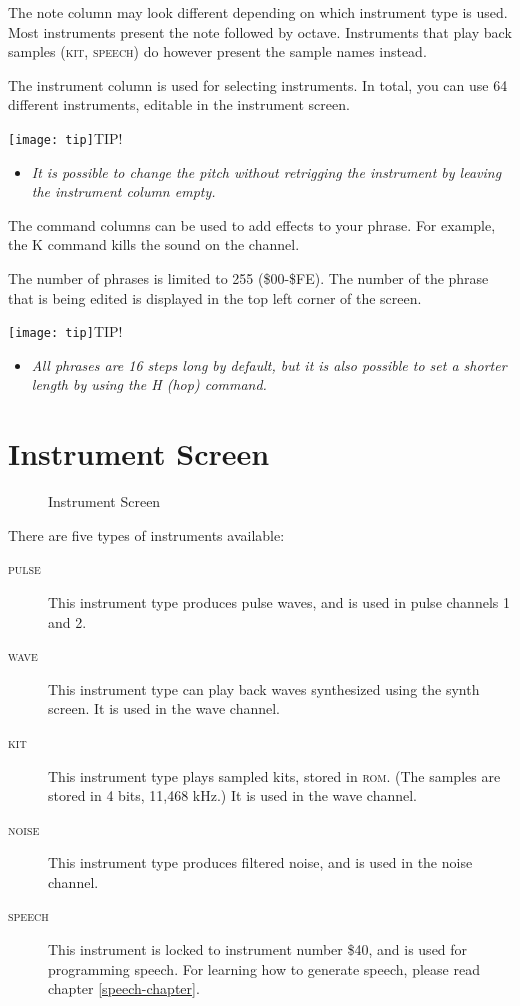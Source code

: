 The note column may look different depending on which instrument type is used. Most instruments present the note followed by octave. Instruments that play back samples (\textsc{kit}, \textsc{speech}) do however present the sample names instead.

The instrument column is used for selecting instruments. In total, you can use 64 different instruments, editable in the instrument screen.

\texttt{[image: tip]}TIP!
\begin{itemize}
\item \textit{It is possible to change the pitch without retrigging the instrument by leaving the instrument column empty.}
\end{itemize}

The command columns can be used to add effects to your phrase. For example, the K command kills the sound on the channel.

The number of phrases is limited to 255 (\$00-\$FE). The number of the phrase that is being edited is displayed in the top left corner of the screen.

\texttt{[image: tip]}TIP!
\begin{itemize}
\item \textit{All phrases are 16 steps long by default, but it is also possible to set a shorter length by using the H (hop) command.}
\end{itemize}


\section{Instrument Screen}

\begin{figure}[hbtp]
\centering
{}
\caption{Instrument Screen}
\label{fig:instr2}
\end{figure}

There are five types of instruments available:

\begin{description}
\item[\textsc{pulse}] This instrument type produces pulse waves, and is used in pulse channels 1 and 2.
\item[\textsc{wave}] This instrument type can play back waves synthesized using the synth screen. It is used in the wave channel.
\item[\textsc{kit}] This instrument type plays sampled kits, stored in \textsc{rom}. (The samples are stored in 4 bits, 11,468 kHz.) It is used in the wave channel.
\item[\textsc{noise}] This instrument type produces filtered noise, and is used in the noise channel.
\item[\textsc{speech}] This instrument is locked to instrument number \$40, and is used for programming speech. For learning how to generate speech, please read chapter \ref{speech-chapter}.
\end{description}

